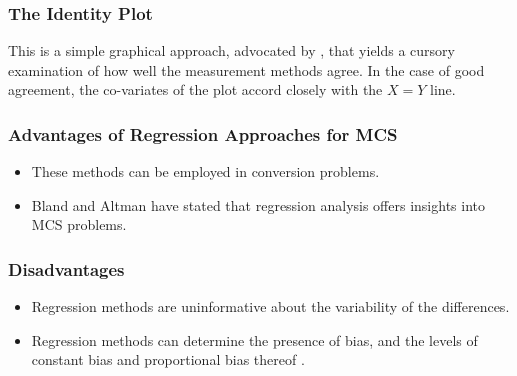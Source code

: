 \documentclass[12pt, a4paper]{report}
\theoremstyle{plain}
\theoremstyle{definition}
\theoremstyle{remark}
\begin{document}
\subsubsection{The Identity Plot} This is a simple graphical approach, advocated by \citet{BA86}, that yields a cursory examination of how well the measurement methods agree. In the case of good agreement, the co-variates of the plot accord closely with the $X=Y$ line.

\subsubsection{Advantages of Regression Approaches for MCS}
\begin{itemize}
	\item These methods can be employed in conversion problems.
	\item Bland and Altman have stated that regression analysis offers insights into MCS problems.
\end{itemize}
\subsubsection{Disadvantages}
\begin{itemize}
	\item Regression methods are uninformative about the variability of the differences.
\end{itemize}

\begin{itemize}\item
	Regression methods can determine the presence of bias, and the levels of constant bias and proportional bias thereof \cite{ludbrook97,ludbrook02}.
\end{itemize}

\end{document}
